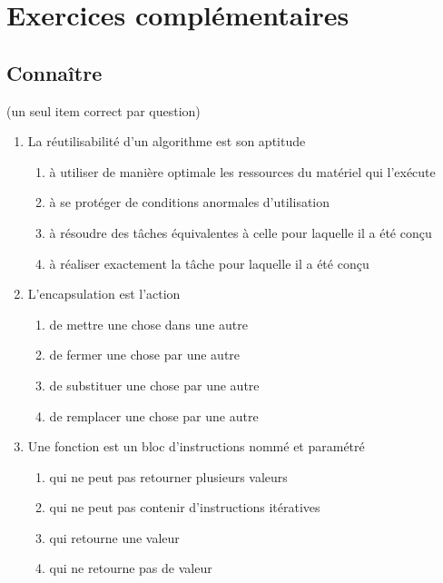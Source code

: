 \section{Exercices complémentaires}

\subsection{Connaître}
\begin{td}[QCM (3)]\label{td:qcm3}
 (un seul item correct par question)
\em
\begin{enumerate}
\item La réutilisabilité d'un algorithme est son aptitude
	\begin{enumerate}
	\item à utiliser de manière optimale les ressources du matériel qui l'exécute
	\item à se protéger de conditions anormales d'utilisation
	\item à résoudre des tâches équivalentes à celle pour laquelle il a été conçu
	\item à réaliser exactement la tâche pour laquelle il a été conçu
	\end{enumerate}

\item L'encapsulation est l'action
	\begin{enumerate}
	\item de mettre une chose dans une autre
	\item de fermer une chose par une autre
	\item de substituer une chose par une autre
	\item de remplacer une chose par une autre
	\end{enumerate}
	
\item Une fonction est un bloc d'instructions nommé et paramétré 
	\begin{enumerate}
	\item qui ne peut pas retourner plusieurs valeurs
	\item qui ne peut pas contenir d'instructions itératives
	\item qui retourne une valeur
	\item qui ne retourne pas de valeur
	\end{enumerate}


\end{enumerate}
\end{td}

